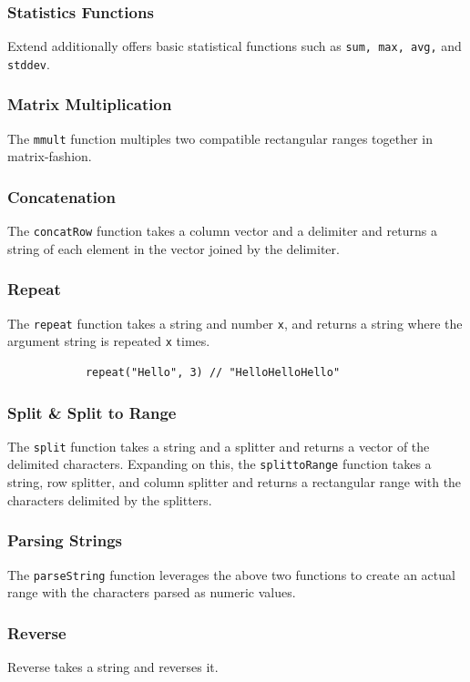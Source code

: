 		\subsubsection{Statistics Functions}
		Extend additionally offers basic statistical functions such as \texttt{sum, max, avg,} and \texttt{stddev}.

		\subsubsection{Matrix Multiplication}
		The \texttt{mmult} function multiples two compatible rectangular ranges together in matrix-fashion.

		\subsubsection{Concatenation}
		The \texttt{concatRow} function takes a column vector and a delimiter and returns a string of each element in the vector joined by the delimiter.

		\subsubsection{Repeat}
		The \texttt{repeat} function takes a string and number \texttt{x}, and returns a string where the argument string is repeated \texttt{x} times.
		\begin{lstlisting}
			repeat("Hello", 3) // "HelloHelloHello"
		\end{lstlisting}

		\subsubsection{Split \& Split to Range}
		The \texttt{split} function takes a string and a splitter and returns a vector of the delimited characters. Expanding on this, the \texttt{splittoRange} function takes a string, row splitter, and column splitter and returns a rectangular range with the characters delimited by the splitters.

		\subsubsection{Parsing Strings}
		The \texttt{parseString} function leverages the above two functions to create an actual range with the characters parsed as numeric values.

		\subsubsection{Reverse}
		Reverse takes a string and reverses it.

